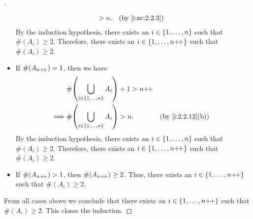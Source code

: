 \begin{proof}[]
\begin{itemize}
\begin{align*}
                                                            & > n.                                           &  & \by{i:ac:2.2.3}
          \end{align*}
          By the induction hypothesis, there exists an \(i \in \left\lbrace1, \dots, n\right\rbrace\) such that \(\#(A_i) \geq 2\).
          Therefore, there exists an \(i \in \left\lbrace1, \dots, n{+}\!{+}\right\rbrace\) such that \(\#(A_i) \geq 2\).
    \item If \(\#(A_{n{+}\!{+}}) = 1\), then we have
          \begin{align*}
                     & \#\pa{\bigcup_{i \in \set{1, \dots, n}} A_i} + 1 > n\pp                       \\
            \implies & \#\pa{\bigcup_{i \in \set{1, \dots, n}} A_i} > n.       &  & \by{i:2.2.12}[b]
          \end{align*}
          By the induction hypothesis, there exists an \(i \in \left\lbrace1, \dots, n\right\rbrace\) such that \(\#(A_i) \geq 2\).
          Therefore, there exists an \(i \in \left\lbrace1, \dots, n{+}\!{+}\right\rbrace\) such that \(\#(A_i) \geq 2\).
    \item If \(\#(A_{n{+}\!{+}}) > 1\), then \(\#(A_{n{+}\!{+}}) \geq 2\).
          Thus, there exists an \(i \in \left\lbrace1, \dots, n{+}\!{+}\right\rbrace\) such that \(\#(A_i) \geq 2\).
  \end{itemize}
  From all cases above we conclude that there exists an \(i \in \left\lbrace1, \dots, n{+}\!{+}\right\rbrace\) such that \(\#(A_i) \geq 2\).
  This closes the induction.
\end{proof}
